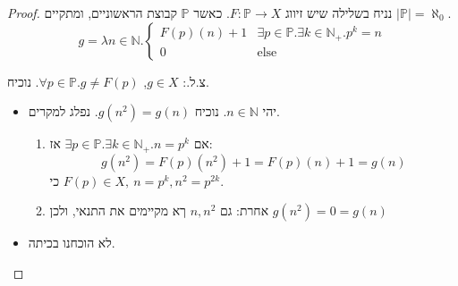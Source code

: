 \documentclass[]{article}
\newcommand\N     {\mathbb{N}}
\renewcommand\P   {\mathbb{P}}
\newcommand\other {\text{else}}
\newcommand\az    {\aleph_0}
\begin{document}
		\begin{proof}
			נניח בשלילה שיש זיווג $F \colon \P \to X$. כאשר $\P$ קבוצת הראשוניים, ומתקיים $|\P| = \az$. 
			\[ g = \lambda n \in \N. \begin{cases}
				F(p)(n) + 1 & \exists p \in \P. \exists k \in \N_+. p^{k} = n \\
				0 & \other
			\end{cases} \]
			
			צ.ל.: $g \in X$, $\forall p \in \P. g \neq F(p)$. נוכיח. 
			\begin{itemize}
				\item יהי $n \in \N$. נוכיח $g(n^2) = g(n)$. נפלג למקרים. 
				\begin{enumerate}
					\item אם $\exists p \in \P. \exists k \in\N_+. n = p^{k}$ אז: 
					\[ g(n^2) = F(p)(n^2) + 1 = F(p)(n) + 1 = g(n) \]
					כי $F(p) \in X, \ n = p^k, n^2 = p^{2k}$. 
					\item אחרת: גם $n, n^2$ ךא מקיימים את התנאי, ולכן $g(n^2) = 0 = g(n)$
				\end{enumerate}
				\item לא הוכחנו בכיתה. 
			\end{itemize}
			
		\end{proof}
\end{document}

